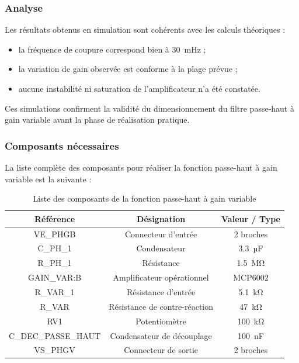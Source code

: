 \documentclass{article}
\begin{document}
\subsubsection{Analyse}

Les résultats obtenus en simulation sont cohérents avec les calculs théoriques :
\begin{itemize}
    \item la fréquence de coupure correspond bien à 30~mHz ;
    \item la variation de gain observée est conforme à la plage prévue ;
    \item aucune instabilité ni saturation de l’amplificateur n’a été constatée.
\end{itemize}

Ces simulations confirment la validité du dimensionnement du filtre passe-haut à gain variable avant la phase de réalisation pratique.

\subsubsection{Composants nécessaires}

La liste complète des composants pour réaliser la fonction passe-haut à gain variable est la suivante :

\begin{table}[h!]
\centering
\caption{Liste des composants de la fonction passe-haut à gain variable}
\begin{tabular}{|c|c|c|}
\hline
\textbf{Référence} & \textbf{Désignation} & \textbf{Valeur / Type} \\
\hline
VE\_PHGB & Connecteur d’entrée & 2 broches \\
\hline
C\_PH\_1 & Condensateur & 3.3~µF \\
\hline
R\_PH\_1 & Résistance & 1.5~MΩ \\
\hline
GAIN\_VAR:B & Amplificateur opérationnel & MCP6002 \\
\hline
R\_VAR\_1 & Résistance d’entrée & 5.1~kΩ \\
\hline
R\_VAR & Résistance de contre-réaction & 47~kΩ \\
\hline
RV1 & Potentiomètre & 100~kΩ \\
\hline
C\_DEC\_PASSE\_HAUT & Condensateur de découplage & 100~nF \\
\hline
VS\_PHGV & Connecteur de sortie & 2 broches \\
\hline
\end{tabular}
\end{table}
\end{document}
